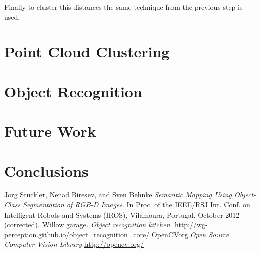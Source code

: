 \documentclass[fontsize=12pt]{article}
\begin{document}
Finally to cluster this distances the same technique from the previous step is used.\\

\section{Point Cloud Clustering}
\label{sec:clustering}
\section{Object Recognition}
\label{sec:recognition}
\section{Future Work}
\label{sec:Future Work}
\section{Conclusions}
\label{sec:Conclusions}

\begin{thebibliography}{9}

  Jorg Stuckler, Nenad Biresev, and Sven Behnke
  \emph{ Semantic Mapping Using Object-Class
Segmentation of RGB-D Images}.
  In Proc. of the IEEE/RSJ Int. Conf. on Intelligent Robots and Systems (IROS), Vilamoura, Portugal, October 2012 (corrected).
  Willow garage. 
  \emph{Object recognition kitchen}. 
  \url{http://wg-perception.github.io/object_recognition_core/}
  OpenCVorg.\emph{Open Source Computer Vision Library}
  \url{http://opencv.org/}
\end{thebibliography}
\end{document}

